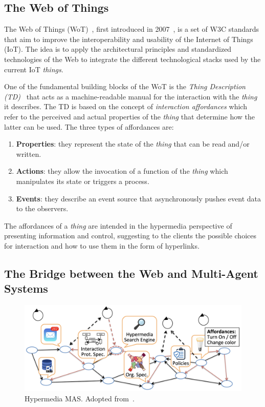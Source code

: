 \subsection{The Web of Things}
The Web of Things (WoT)~\cite{wot}, first introduced in 2007~\cite{guinard2011web}, is a set of W3C standards that aim to improve the interoperability and usability of the Internet of Things (IoT).
The idea is to apply the architectural principles and standardized technologies of the Web to integrate the different technological stacks used by the current IoT \textit{things}.

One of the fundamental building blocks of the WoT is the \textit{Thing Description (TD)}~\cite{wottd} that acts as a machine-readable manual for the interaction with the \textit{thing} it describes.
The TD is based on the concept of \textit{interaction affordances} which refer to the perceived and actual properties of the \textit{thing} that determine how the latter can be used.
The three types of affordances are:
\begin{enumerate}
    \item \textbf{Properties}: they represent the state of the \textit{thing} that can be read and/or written.
    \item \textbf{Actions}: they allow the invocation of a function of the \textit{thing} which manipulates its state or triggers a process.
    \item \textbf{Events}: they describe an event source that asynchronously pushes event data to the observers.
\end{enumerate}
The affordances of a \textit{thing} are intended in the hypermedia perspective of presenting information and control, suggesting to the clients the possible choices for interaction and how to use them in the form of hyperlinks.

\subsection{The Bridge between the Web and Multi-Agent Systems}

\begin{figure}
    \centering
    \includegraphics[width=\linewidth]{images/hypermedia-mas.png}
    \caption{Hypermedia MAS. Adopted from~\cite{ciortea2019}.}
    \label{fig:hypermedia-mas}
\end{figure}

